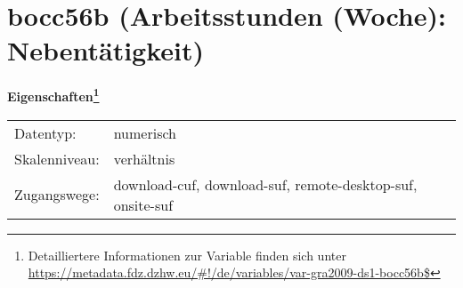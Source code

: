 
    \setcounter{footnote}{0}

    \vspace*{-1.8cm}
	\section{bocc56b (Arbeitsstunden (Woche): Nebentätigkeit)}
	\label{section:bocc56b}



    \vspace*{0.5cm}
    \noindent\textbf{Eigenschaften\footnote{Detailliertere Informationen zur Variable finden sich unter
		\url{https://metadata.fdz.dzhw.eu/\#!/de/variables/var-gra2009-ds1-bocc56b$}}}\\
	\begin{tabularx}{\hsize}{@{}lX}
	Datentyp: & numerisch \\
	Skalenniveau: & verhältnis \\
	Zugangswege: &
	  download-cuf, 
	  download-suf, 
	  remote-desktop-suf, 
	  onsite-suf
 \\
    \end{tabularx}



